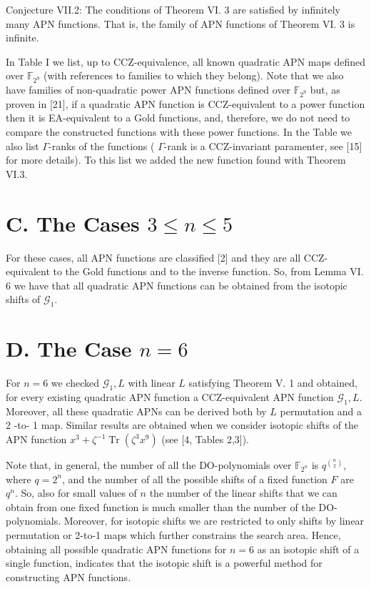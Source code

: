 \documentclass[10pt]{article}
\begin{document}
Conjecture VII.2: The conditions of Theorem VI. 3 are satisfied by infinitely many APN functions. That is, the family of APN functions of Theorem VI. 3 is infinite.

In Table I we list, up to CCZ-equivalence, all known quadratic APN maps defined over $\mathbb{F}_{2^{9}}$ (with references to families to which they belong). Note that we also have families of non-quadratic power APN functions defined over $\mathbb{F}_{2^{9}}$ but, as proven in [21], if a quadratic APN function is CCZ-equivalent to a power function then it is EA-equivalent to a Gold functions, and, therefore, we do not need to compare the constructed functions with these power functions. In the Table we also list $\Gamma$-ranks of the functions ( $\Gamma$-rank is a CCZ-invariant paramenter, see [15] for more details). To this list we added the new function found with Theorem VI.3.

\section*{C. The Cases $3 \leq n \leq 5$}
For these cases, all APN functions are classified [2] and they are all CCZ-equivalent to the Gold functions and to the inverse function. So, from Lemma VI. 6 we have that all quadratic APN functions can be obtained from the isotopic shifts of $\mathcal{G}_{1}$.

\section*{D. The Case $n=6$}
For $n=6$ we checked $\mathcal{G}_{1}, L$ with linear $L$ satisfying Theorem V. 1 and obtained, for every existing quadratic APN function a CCZ-equivalent APN function $\mathcal{G}_{1}, L$. Moreover, all these quadratic APNs can be derived both by $L$ permutation and a 2 -to- 1 map. Similar results are obtained when we consider isotopic shifts of the APN function $x^{3}+\zeta^{-1} \operatorname{Tr}\left(\zeta^{3} x^{9}\right)$ (see [4, Tables 2,3]).

Note that, in general, the number of all the DO-polynomials over $\mathbb{F}_{2^{n}}$ is $q^{\binom{n}{2}}$, where $q=2^{n}$, and the number of all the possible shifts of a fixed function $F$ are $q^{n}$. So, also for small values of $n$ the number of the linear shifts that we can obtain from one fixed function is much smaller than the number of the DO-polynomials. Moreover, for isotopic shifts we are restricted to only shifts by linear permutation or 2-to-1 maps which further constrains the search area. Hence, obtaining all possible quadratic APN functions for $n=6$ as an isotopic shift of a single function, indicates that the isotopic shift is a powerful method for constructing APN functions.
\end{document}
